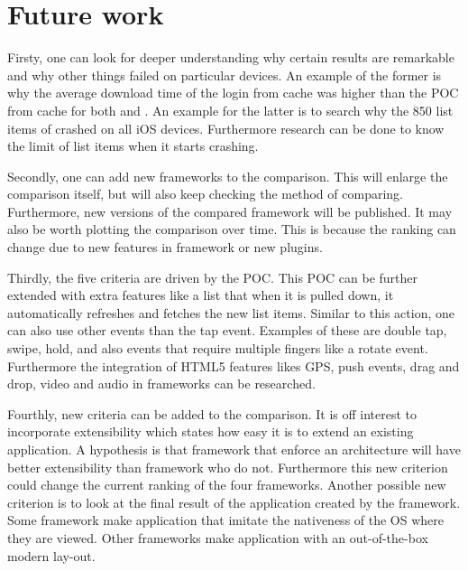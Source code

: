 \documentclass[a4paper]{artikel3}
\begin{document}

\section{Future work} %
\label{sec:future_work}
Firsty, one can look for deeper understanding why certain results are remarkable and why other things failed on particular devices.
An example of the former is why the average download time of the login from cache was higher than the POC from cache for both \jqma{} and \lungo{}.
An example for the latter is to search why the 850 list items of \kendob{} crashed on all iOS devices.
Furthermore research can be done to know the limit of list items when it starts crashing.

Secondly, one can add new frameworks to the comparison.
This will enlarge the comparison itself, but will also keep checking the method of comparing.
Furthermore, new versions of the compared framework will be published.
It may also be worth plotting the comparison over time.
This is because the ranking can change due to new features in framework or new plugins.

Thirdly, the five criteria are driven by the POC.
This POC can be further extended with extra features like a list that when it is pulled down, it automatically refreshes and fetches the new list items.
Similar to this action, one can also use other events than the tap event.
Examples of these are double tap, swipe, hold, and also events that require multiple fingers like a rotate event.
Furthermore the integration of HTML5 features likes GPS, push events, drag and drop, video and audio in frameworks can be researched.

Fourthly, new criteria can be added to the comparison.
It is off interest to incorporate extensibility which states how easy it is to extend an existing application.
A hypothesis is that framework that enforce an architecture will have better extensibility than framework who do not.
Furthermore this new criterion could change the current ranking of the four frameworks.
Another possible new criterion is to look at the final result of the application created by the framework.
Some framework make application that imitate the nativeness of the OS where they are viewed.
Other frameworks make application with an out-of-the-box modern lay-out.
\end{document}
